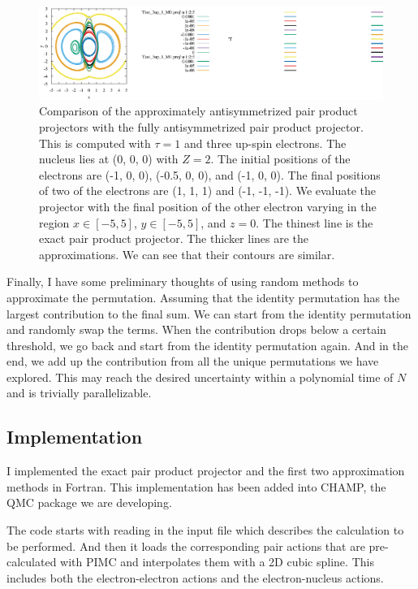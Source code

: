 \documentclass[aps,prl,reprint,groupedaddress]{revtex4-1}
\begin{document}
\begin{figure}
\includegraphics[scale=0.8,clip,trim=0 0 23cm 0]{Test_3up_1=1_mod}%
\caption{\label{fig:comp}
Comparison of the approximately antisymmetrized pair product projectors with the fully antisymmetrized pair product projector.
This is computed with $\tau = 1$ and three up-spin electrons.
The nucleus lies at (0, 0, 0) with $Z=2$.
The initial positions of the electrons are (-1, 0, 0), (-0.5, 0, 0), and (-1, 0, 0).
The final positions of two of the electrons are (1, 1, 1) and (-1, -1, -1).
We evaluate the projector with the final position of the other electron varying in the region $x\in[-5,5]$, $y\in[-5,5]$, and $z = 0$.
The thinest line is the exact pair product projector.
The thicker lines are the approximations.
We can see that their contours are similar.
}
\end{figure}

Finally, I have some preliminary thoughts of using random methods to approximate the permutation.
Assuming that the identity permutation has the largest contribution to the final sum.
We can start from the identity permutation and randomly swap the terms.
When the contribution drops below a certain threshold, we go back and start from the identity permutation again.
And in the end, we add up the contribution from all the unique permutations we have explored.
This may reach the desired uncertainty within a polynomial time of $N$ and is trivially parallelizable.

\subsection{Implementation}

I implemented the exact pair product projector and the first two approximation methods in Fortran.
This implementation has been added into CHAMP, the QMC package we are developing.

The code starts with reading in the input file which describes the calculation to be performed.
And then it loads the corresponding pair actions that are pre-calculated with PIMC and interpolates them with a 2D cubic spline.
This includes both the electron-electron actions and the electron-nucleus actions.
\end{document}
